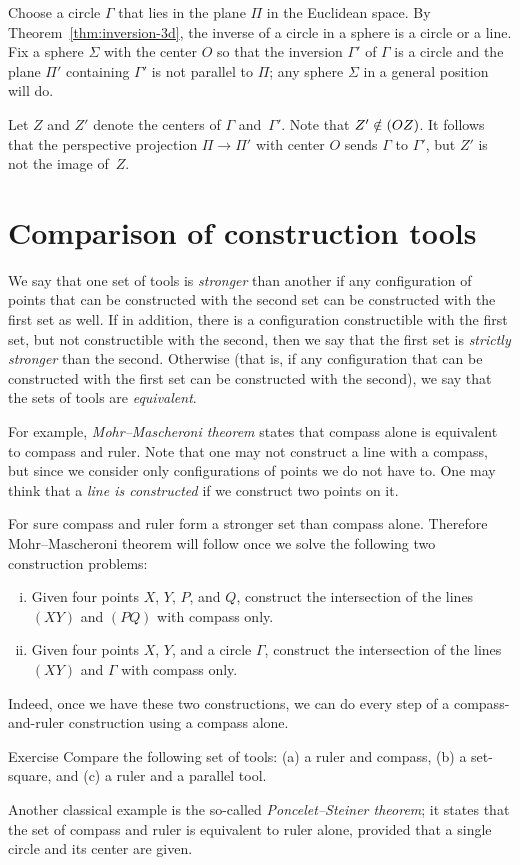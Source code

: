 Choose a circle $\Gamma$ that lies in the plane $\Pi$ in the Euclidean space.
By Theorem~\ref{thm:inversion-3d}, 
the inverse of a circle in a sphere is a circle or a line.
Fix a sphere $\Sigma$ with the center $O$ so that the inversion $\Gamma'$ of $\Gamma$
is a circle and the plane $\Pi'$ containing $\Gamma'$ is not parallel to $\Pi$;
any sphere $\Sigma$ in a general position will do.

Let $Z$ and $Z'$ denote the centers of $\Gamma$ and~$\Gamma'$.
Note that  $Z'\z\notin(OZ)$.
It follows that the perspective projection $\Pi\to \Pi'$ with center $O$ sends $\Gamma$ to $\Gamma'$, but $Z'$ is not the image of~$Z$.
\qeds

\section*{Comparison of construction tools}

We say that one set of tools is \emph{stronger} than another if any configuration of points that can be constructed with the second set can be constructed with the first set as well.
If in addition, there is a configuration constructible with the first set, but not constructible with the second, then we say that the first set is {}\emph{strictly stronger} than the second.
Otherwise (that is, if any configuration that can be constructed with the first set can be constructed with the second), we say that the sets of tools are \emph{equivalent}. 

For example, \emph{Mohr--Mascheroni theorem} states that compass alone is equivalent to compass and ruler.
Note that one may not construct a line with a compass, but since we consider only configurations of points we do not have to.
One may think that a \emph{line is constructed} if we construct two points on it.

For sure compass and ruler form a stronger set than compass alone.
Therefore Mohr--Mascheroni theorem will follow once we solve the following two construction problems:
\begin{enumerate}[(i)]
\item Given four points $X$, $Y$, $P$, and $Q$, construct the intersection of the lines $(XY)$ and $(PQ)$ with compass only.
\item  Given four points $X$, $Y$, and a circle $\Gamma$, construct the intersection of the lines $(XY)$ and $\Gamma$ with compass only.
\end{enumerate}
Indeed, once we have these two constructions, we can do every step of a compass-and-ruler construction using a compass alone.

\begin{thm}{Exercise}\label{ex:comparison}
Compare the following set of tools: (a) a ruler and compass, (b) a set-square, and (c) a ruler and a parallel tool.
\end{thm}

Another classical example is the so-called \emph{Poncelet--Steiner theorem};
it states that the set of compass and ruler is equivalent to ruler alone, provided that a single circle and its center are given.

